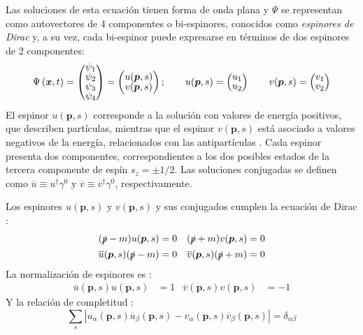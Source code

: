 Las soluciones de esta ecuación tienen forma de onda plana y $\Psi$ se representan como autovectores de 4 componentes o bi-espinores, conocidos como \textit{espinores de Dirac} \cite{MCR} y, a su vez, cada bi-espinor puede expresarse en términos de dos espinores de 2 componentes:
\begin{align}
\begingroup 
\renewcommand*{\arraystretch}{0.8}
\setlength\arraycolsep{10pt}
\Psi \left( \boldsymbol{x}, t\right) =\begin{pmatrix} \psi_{1} \\ \psi_{2} \\ \psi_{3} \\ \psi_{4} \end{pmatrix}=\begin{pmatrix} u(\boldsymbol{p},s) \\ v(\boldsymbol{p},s) \end{pmatrix}; \qquad u(\boldsymbol{p},s)=\begin{pmatrix} u_{1} \\ u_{2} \end{pmatrix} \qquad
v(\boldsymbol{p},s)=\begin{pmatrix} v_{1} \\ v_{2}\label{eq:espinores} \end{pmatrix}
\endgroup
\end{align}
El espinor $u(\boldsymbol{p},s)$ corresponde a la solución con valores de energía positivos, que describen partículas, mientras que el espinor $v(\boldsymbol{p},s)$ está asociado a valores negativos de la energía, relacionados con las antipartículas \cite{Donelly}. Cada espinor presenta dos componentes, correspondientes a los dos posibles estados de la tercera componente de espín $s_z=\pm 1/2$. \cite{Bettini} Las soluciones conjugadas se definen como $\overline{u} \equiv u^{\dagger} \gamma^{0}$ y $\overline{v} \equiv v^{\dagger} \gamma^{0}$, respectivamente.

Los espinores $u(\boldsymbol{p},s)$ y $v(\boldsymbol{p},s)$ y sus conjugados cumplen la ecuación de Dirac \cite{Donelly}:
\begin{equation}
\begin{aligned}
(\slashed{p}-m)u(\boldsymbol{p},s) &=0 & (\slashed{p}+m)v(\boldsymbol{p},s) &=0 \\
\overline{u}(\boldsymbol{p},s)(\slashed{p}-m) &=0 & \overline{v}(\boldsymbol{p},s )(\slashed{p}+m)&=0
\end{aligned}
\end{equation}
La normalización de espinores es \cite{MCR}:
\begin{align}
\overline{u}(\boldsymbol{p},s)u(\boldsymbol{p},s) &= 1 & \overline{v}(\boldsymbol{p},s)v(\boldsymbol{p},s) &= -1
\end{align}
Y la relación de completitud \cite{MCR}:  %
\begin{equation}
\sum _{s}\left| u_{\alpha }\left(\boldsymbol{p},s\right) \overline{u}_{\beta }\left(\boldsymbol{p},s\right) -v_{\alpha }\left(\boldsymbol{p},s\right) \overline{v}_{\beta }\left(\boldsymbol{p},s\right) \right| =\delta _{\alpha \beta }
\end{equation}

